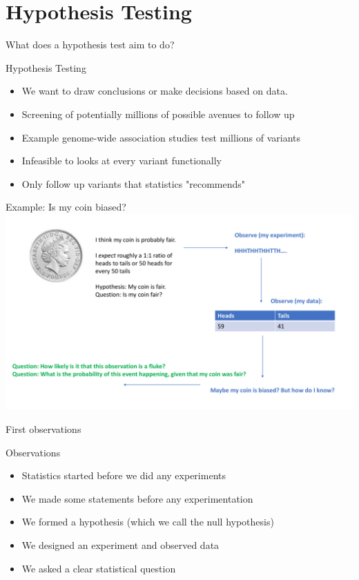 \documentclass{bredelebeamer}
\begin{document}
\section{Hypothesis Testing}
\begin{frame}{What does a hypothesis test aim to do?}
\begin{block}{Hypothesis Testing}
	\begin{itemize}
	\item We want to draw conclusions or make decisions based on data.
	\item Screening of potentially millions of possible avenues to follow up
	\item Example genome-wide association studies test millions of variants
	\item Infeasible to looks at every variant functionally
	\item Only follow up variants that statistics "recommends" 
	\end{itemize}  
\end{block}
\end{frame}

\begin{frame}{Example: Is my coin biased?}
 \includegraphics[width=1\textwidth]{cointoss.pdf}
\end{frame}

\begin{frame}{First observations}
\begin{block}{Observations}
	\begin{itemize}
		\item Statistics started before we did any experiments
		\item We made some statements before any experimentation
		\item We formed a hypothesis (which we call the null hypothesis)
		\item We designed an experiment and observed data
		\item We asked a clear statistical question
	\end{itemize}
\end{block}
\end{frame}
\end{document}
